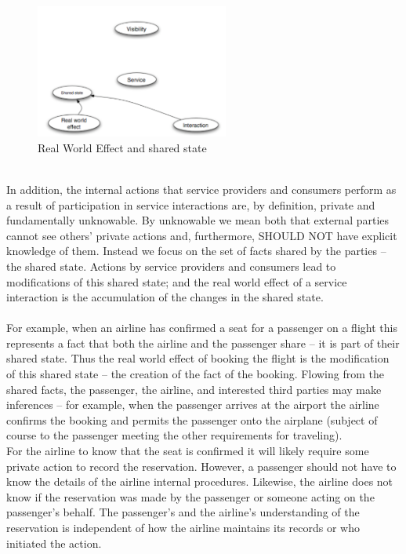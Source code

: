 \documentclass[10pt,a4paper]{article}
\begin{document}
\begin{figure}[h!]
 \hfill \includegraphics[width=180pt]{images/real-world-effect}\hspace*{\fill}
  \caption{Real World Effect and shared state}
  \label{fig:real-world-effect}
\end{figure}  \\
In addition, the internal actions that service providers and consumers perform as a result of participation in service interactions are, by definition, private and fundamentally unknowable. By unknowable we mean both that external parties cannot see others’ private actions and, furthermore, SHOULD NOT have explicit knowledge of them. Instead we focus on the set of facts shared by the parties – the shared state. Actions by service providers and consumers lead to modifications of this shared state; and the real world effect of a service interaction is the accumulation of the changes in the shared state. \\ \\
For example, when an airline has confirmed a seat for a passenger on a flight this represents a fact that both the airline and the passenger share – it is part of their shared state. Thus the real world effect of booking the flight is the modification of this shared state – the creation of the fact of the booking. Flowing from the shared facts, the passenger, the airline, and interested third parties may make inferences – for example, when the passenger arrives at the airport the airline confirms the booking and permits the passenger onto the airplane (subject of course to the passenger meeting the other requirements for traveling). \\ For the airline to know that the seat is confirmed it will likely require some private action to record the reservation. However, a passenger should not have to know the details of the airline internal procedures. Likewise, the airline does not know if the reservation was made by the passenger or someone acting on the passenger’s behalf. The passenger’s and the airline’s understanding of the reservation is independent of how the airline maintains its records or who initiated the action.
\end{document}

